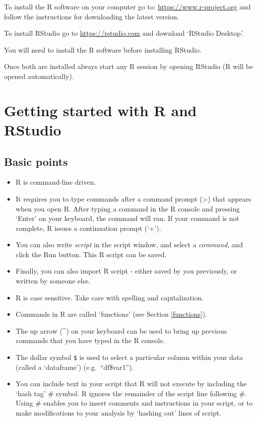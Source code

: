 \documentclass[
]{book}
\providecommand{\tightlist}{%
  \setlength{\itemsep}{0pt}\setlength{\parskip}{0pt}}
\begin{document}
To install the R software on your computer go to: \url{https://www.r-project.org} and follow the instructions for downloading the latest version.

To install RStudio go to \url{https://rstudio.com} and download `RStudio Desktop'.

You will need to install the R software before installing RStudio.

Once both are installed always start any R session by opening RStudio (R will be opened automatically).

\hypertarget{start}{%
\section{Getting started with R and RStudio}\label{start}}

\hypertarget{basic}{%
\subsection{Basic points}\label{basic}}

\begin{itemize}
\tightlist
\item
  R is command-line driven.
\item
  It requires you to type commands after a command prompt (\textgreater) that appears when you open R. After typing a command in the R console and pressing `Enter' on your keyboard, the command will run. If your command is not complete, R issues a continuation prompt (`+').
\item
  You can also write \emph{script} in the script window, and select a \emph{command}, and click the Run button. This R script can be saved.
\item
  Finally, you can also import R script - either saved by you previously, or written by someone else.
\item
  R is case sensitive. Take care with spelling and capitalization.
\item
  Commands in R are called `functions' (see Section \ref{functions}).
\item
  The up arrow (\^{}) on your keyboard can be used to bring up previous commands that you have typed in the R console.
\item
  The dollar symbol \texttt{\$} is used to select a particular column within your data (called a `dataframe') (e.g.~``df\$var1'').
\item
  You can include text in your script that R will not execute by including the `hash tag' \# symbol. R ignores the remainder of the script line following \#. Using \# enables you to insert comments and instructions in your script, or to make modifications to your analysis by `hashing out' lines of script.
\end{itemize}
\end{document}

